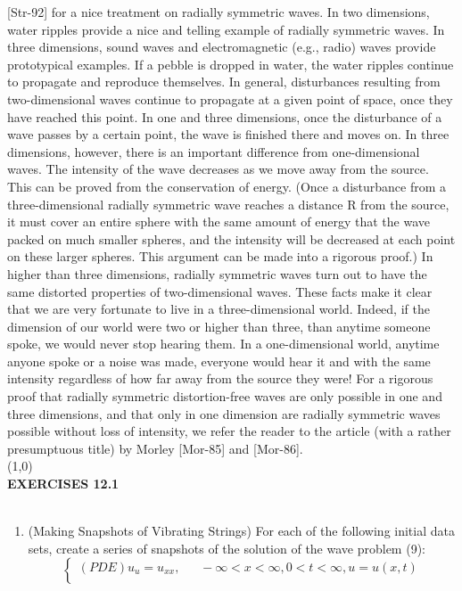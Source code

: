 \documentclass[../main.tex]{subfiles}
\begin{document}
{{[Str-92] for a nice treatment on radially symmetric waves. In two dimensions, 
water ripples provide a nice and telling example of radially symmetric waves. In 
three dimensions, sound waves and electromagnetic (e.g., radio) waves provide 
prototypical examples. If a pebble is dropped in water, the water ripples continue 
to propagate and reproduce themselves. In general, disturbances resulting from two-dimensional waves continue to propagate at a given point of space, once they 
have reached this point. In one and three dimensions, once the disturbance of a 
wave passes by a certain point, the wave is finished there and moves on. In three 
dimensions, however, there is an important difference from one-dimensional 
waves. The intensity of the wave decreases as we move away from the source. 
This can be proved from the conservation of energy. (Once a disturbance from a 
three-dimensional radially symmetric wave reaches a distance R from the source, 
it must cover an entire sphere with the same amount of energy that the wave 
packed on much smaller spheres, and the intensity will be decreased at each point 
on these larger spheres. This argument can be made into a rigorous proof.) In 
higher than three dimensions, radially symmetric waves turn out to have the same 
distorted properties of two-dimensional waves. These facts make it clear that we 
are very fortunate to live in a three-dimensional world. Indeed, if the dimension of 
our world were two or higher than three, than anytime someone spoke, we would 
never stop hearing them. In a one-dimensional world, anytime anyone spoke or a 
noise was made, everyone would hear it and with the same intensity regardless of 
how far away from the source they were! For a rigorous proof that radially 
symmetric distortion-free waves are only possible in one and three dimensions, 
and that only in one dimension are radially symmetric waves possible without loss 
of intensity, we refer the reader to the article (with a rather presumptuous title) by 
Morley [Mor-85] and [Mor-86].  
\\
\line(1,0){\textwidth}
\\
\textbf{EXERCISES 12.1}
\\
\\
\begin{enumerate}
 \item
		(Making Snapshots of Vibrating Strings) For each of the following initial data sets, create a 
series of snapshots of the solution of the wave problem (9): 
$$
\begin{cases} 
(PDE) u_u=u_{xx}, ~~~~~~~ -\infty <x< \infty ,0<t< \infty , u=u(x,t)\\ 

\end{cases}$$
\end{enumerate}}}
\end{document}
